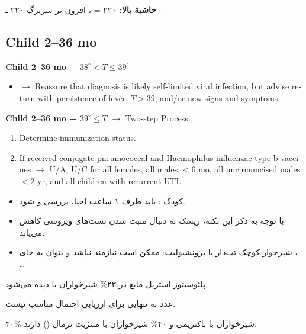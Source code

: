 \documentclass[12pt,a4paper]{article}
\begin{document}
\textbf{حاشیهٔ بالا:} ۲۲۰ = ، افزون بر سربرگ ۲۲۰ ـ .

\begin{latin}
\subsection*{Child 2--36 mo}
\textbf{Child 2--36 mo + \(38^\circ<T\leq39^\circ\)}
\begin{itemize}
\item \(\longrightarrow\) Reassure that diagnosis is likely self-limited viral infection,
  but advise return with persistence of fever, \(T>39\), and/or new signs and symptoms.
\end{itemize}

\textbf{Child 2--36 mo + \(39^\circ\leq T\)}
\(\longrightarrow\) Two-step Process.
\begin{enumerate}
\item Determine immunization status.
\item If received conjugate pneumococcal and Haemophilus influenzae type b vaccines
  \(\longrightarrow\) U/A, U/C for all females, all males \(<6\) mo,
  all uncircumcised males \(<2\) yr, and all children with recurrent UTI.
\end{enumerate}
\end{latin}

\begin{itemize}
\item کودک : باید ظرف ۱ ساعت احیا، بررسی و  شود.
\item با توجه به ذکر این نکته، ریسک  به دنبال مثبت شدن تست‌های ویروسی کاهش می‌یابد.
\item شیرخوار کوچک تب‌دار با برونشیولیت: ممکن است نیازمند  نباشد و بتوان به جای ، \ldots
\end{itemize}

پلئوسیتوز استریل مایع  در ۲۳\% شیرخواران با  دیده می‌شود.

عدد  به تنهایی برای ارزیابی احتمال  مناسب نیست.

۳۰\% شیرخواران با باکتریمی و ۴۰\% شیرخواران با مننژیت  نرمال () دارند.
\end{document}
